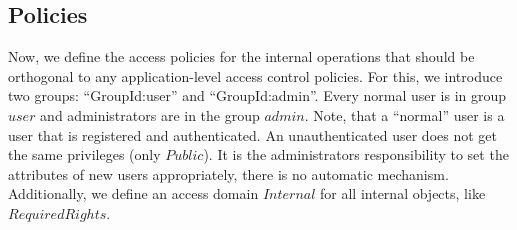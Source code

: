 \subsection{Policies}
Now, we define the access policies for the internal operations that should be
orthogonal to any application-level access control policies.  For this, we
introduce two groups: ``GroupId:user'' and ``GroupId:admin''.  Every normal user
is in group $user$ and administrators are in the group $admin$.  Note, that a
``normal'' user is a user that is registered and authenticated.  An
unauthenticated user does not get the same privileges (only $Public$).  It is
the administrators responsibility to set the attributes of new users
appropriately, there is no automatic mechanism.  Additionally, we define an
access domain $Internal$ for all internal objects, like $RequiredRights$.

